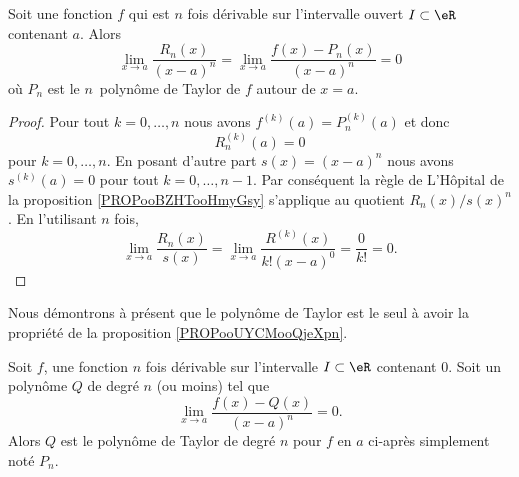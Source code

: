 \begin{proposition}      \label{PROPooUYCMooQjeXpn}
	Soit une fonction \( f\) qui est \( n\) fois dérivable sur l'intervalle ouvert \( I\subset \eR\) contenant \( a\). Alors
	\begin{equation}
		\lim_{x\to a} \frac{ R_n(x) }{ (x-a)^n }=\lim_{x\to a} \frac{ f(x)-P_n(x) }{ (x-a)^n }=0
	\end{equation}
	où \( P_n\) est le \( n\)\ieme\ polynôme de Taylor de \( f\) autour de \( x=a\).
\end{proposition}

\begin{proof}
	Pour tout \( k=0,\ldots, n\) nous avons \( f^{(k)}(a)=P_n^{(k)}(a)\) et donc
	\begin{equation}
		R_n^{(k)}(a)=0
	\end{equation}
	pour \( k=0,\ldots, n\). En posant d'autre part \( s(x)=(x-a)^n\) nous avons \( s^{(k)}(a)=0\) pour tout \( k=0,\ldots, n-1\). Par conséquent la règle de L'Hôpital de la proposition \ref{PROPooBZHTooHmyGsy} s'applique au quotient \( R_n(x)/s(x)^n\). En l'utilisant \( n\) fois,
	\begin{equation}
		\lim_{x\to a} \frac{ R_n(x) }{ s(x) }=\lim_{x\to a} \frac{ R^{(k)}(x) }{ k!(x-a)^0 }=\frac{ 0 }{ k! }=0.
	\end{equation}
\end{proof}

Nous démontrons à présent que le polynôme de Taylor est le seul à avoir la propriété de la proposition \ref{PROPooUYCMooQjeXpn}.
\begin{proposition}
	Soit \( f\), une fonction \( n\) fois dérivable sur l'intervalle \( I\subset \eR\) contenant \( 0\). Soit un polynôme \( Q\) de degré \( n\) (ou moins) tel que
	\begin{equation}    \label{EQooXPTIooOZqBaD}
		\lim_{x\to a} \frac{ f(x)-Q(x) }{ (x-a)^n  }=0.
	\end{equation}
	Alors \( Q\) est le polynôme de Taylor de degré \( n\) pour \( f\) en \( a\) ci-après simplement noté \( P_n\).
\end{proposition}

